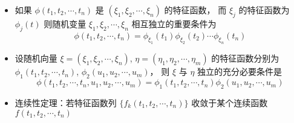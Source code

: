 \begin{itemize}[leftmargin=\subparitemindent]
    而 $ F(x_1, x_2, \cdots, x_n) $ 是它的分布函数，则
    \begin{equation}
        P\left\{ a_k < \xi_k < b_k \right\} 
        = \lim_{T_j \rightarrow \infty} \frac{1}{(2\pi)^n}
        \int_{-T_1}^{T_1} \int_{-T_2}^{T_2} \cdots \int_{-T_n}^{T_n}
        \prod_{k=1}^{n} \frac{
            e^{-\symrm{i}t_ka_k} - e^{-\symrm{i}t_kb_k}
        }{
            \symrm{i}t_k
        } \cdot \phi(t_1, t_2, \cdots, t_n) \diff t_1, \diff t_2, \cdots, \diff t_n
    \end{equation}
    其中，$ k = 1, 2, \cdots, n $ , $ a_k $ 和 $ b_k $ 都是任意实数，但满足 $ (\xi_1, \xi_2, \cdots, \xi_n) $ 落在平行体
    $ a_k \leqslant \xi_k \leqslant b_k, k = 1, 2, \cdots, n $ 的面上的概率为零。
    \item 如果 $ \phi(t_1, t_2, \cdots, t_n) $ 是 $ (\xi_1, \xi_2, \cdots, \xi_n) $ 的特征函数，
    而 $ \xi_j $ 的特征函数为 $ \phi_j(t) $ 则随机变量 $ \xi_1, \xi_2, \cdots, \xi_n $ 相互独立的重要条件为
    \begin{equation}
        \phi(t_1, t_2, \cdots, t_n) = \phi_{\xi_1}(t_1) \phi_{\xi_2}(t_2) \cdots \phi_{\xi_n}(t_n)
    \end{equation}
    \item 设随机向量 $ \xi = (\xi_1, \xi_2, \cdots, \xi_n) $, $ \eta = (\eta_1, \eta_2, \cdots, \eta_m) $
    的特征函数分别为 $ \phi_1(t_1, t_2, \cdots, t_n) $, $\phi_2(u_1, u_2, \cdots, u_m) $，
    则 $ \xi $ 与 $ \eta $ 独立的充分必要条件是
    \begin{equation}
        \phi(t_1, t_2, \cdots, t_n, u_1, u_2, \cdots, u_m) = \phi_1(t_1, t_2, \cdots, t_n) \phi_2(u_1, u_2, \cdots, u_m)
    \end{equation}
    \item 连续性定理：若特征函数列 $ \{ f_k(t_1, t_2, \cdots, t_n) \} $ 收敛于某个连续函数 $ f(t_1, t_2, \cdots, t_n) $
\end{itemize}
